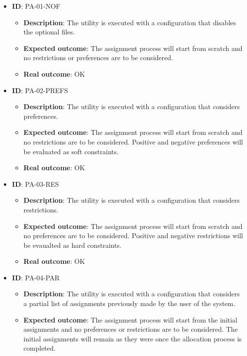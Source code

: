 \begin{itemize}
    \item \textbf{ID}: PA-01-NOF
        \begin{itemize}
            \item \textbf{Description}: The utility is executed with a configuration that disables the optional files.
            \item \textbf{Expected outcome}: The assignment process will start from scratch and no restrictions or preferences are to be considered.
            \item \textbf{Real outcome}: OK
        \end{itemize}
    \item \textbf{ID}: PA-02-PREFS
        \begin{itemize}
            \item \textbf{Description}: The utility is executed with a configuration that considers preferences.
            \item \textbf{Expected outcome}: The assignment process will start from scratch and no restrictions are to be considered. Positive and negative preferences will be evaluated as soft constraints.
            \item \textbf{Real outcome}: OK
        \end{itemize}
    \item \textbf{ID}: PA-03-RES
        \begin{itemize}
            \item \textbf{Description}: The utility is executed with a configuration that considers restrictions.
            \item \textbf{Expected outcome}: The assignment process will start from scratch and no preferences are to be considered. Positive and negative restrictions will be evaualted as hard constraints.
            \item \textbf{Real outcome}: OK
        \end{itemize}
    \item \textbf{ID}: PA-04-PAR
        \begin{itemize}
            \item \textbf{Description}: The utility is executed with a configuration that considers a partial list of assignments previously made by the user of the system.
            \item \textbf{Expected outcome}: The assignment process will start from the initial assignments and no preferences or restrictions are to be considered. The initial assignments will remain as they were once the allocation process is completed.

\end{itemize}
\end{itemize}
